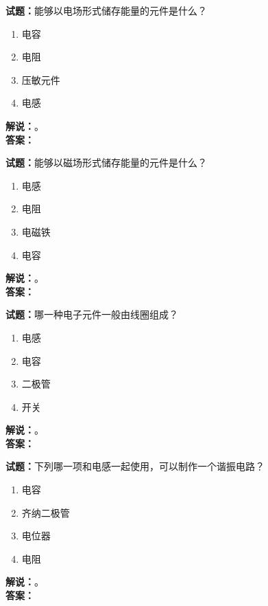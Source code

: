 \documentclass{ctexbook}
\begin{document}
\bigskip




\noindent\textbf{试题：}能够以电场形式储存能量的元件是什么？
\begin{enumerate}[leftmargin=3em]
\item 电容
\item 电阻
\item 压敏元件
\item 电感
\end{enumerate}
\noindent\textbf{解说：}\textbf{}。\\\noindent\textbf{答案：}

\bigskip




\noindent\textbf{试题：}能够以磁场形式储存能量的元件是什么？
\begin{enumerate}[leftmargin=3em]
\item 电感
\item 电阻
\item 电磁铁
\item 电容
\end{enumerate}
\noindent\textbf{解说：}\textbf{}。\\\noindent\textbf{答案：}

\bigskip




\noindent\textbf{试题：}哪一种电子元件一般由线圈组成？
\begin{enumerate}[leftmargin=3em]
\item 电感
\item 电容
\item 二极管
\item 开关
\end{enumerate}
\noindent\textbf{解说：}\textbf{}。\\\noindent\textbf{答案：}

\bigskip




\noindent\textbf{试题：}下列哪一项和电感一起使用，可以制作一个谐振电路？
\begin{enumerate}[leftmargin=3em]
\item 电容
\item 齐纳二极管
\item 电位器
\item 电阻
\end{enumerate}
\noindent\textbf{解说：}\textbf{}。\\\noindent\textbf{答案：}

\bigskip
\end{document}
